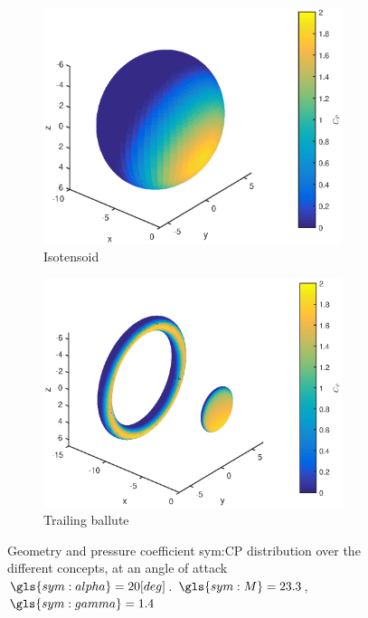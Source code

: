\begin{figure}[h]
	\begin{subfigure}[b]{0.49\textwidth}
		\includegraphics[width=0.96\textwidth]{./Figure/aero_model/isotensoid.eps}
		\caption{Isotensoid}
		\label{fig:cpisotensoid}
	\end{subfigure}
	\begin{subfigure}[b]{0.49\textwidth}
		\includegraphics[width=0.96\textwidth]{./Figure/aero_model/ballute.eps}
		\caption{Trailing ballute}
		\label{fig:cpballute}
	\end{subfigure}	
	\caption{Geometry and pressure coefficient \gls{sym:CP} distribution over the different concepts, at an angle of attack $\gls{sym:alpha}=20[deg]$. $\gls{sym:M}=23.3$, $\gls{sym:gamma}=1.4$}
	\label{fig:conceptscp}
\end{figure}



